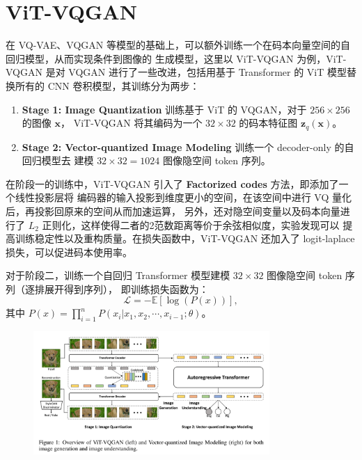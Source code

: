 \section{ViT-VQGAN}

在 VQ-VAE、VQGAN 等模型的基础上，可以额外训练一个在码本向量空间的自回归模型，从而实现条件到图像的
生成模型，这里以 ViT-VQGAN 为例，ViT-VQGAN 是对 VQGAN 进行了一些改进，包括用基于 Transformer 的
ViT 模型替换所有的 CNN 卷积模型，其训练分为两步：
\begin{enumerate}
    \item \textbf{Stage 1: Image Quantization} 训练基于 ViT 的 VQGAN，对于 $256\times256$ 的图像 $\bm{x}$，
    ViT-VQGAN 将其编码为一个 $32\times32$ 的码本特征图 $\bm{z}_q(\bm{x})$。
    \item \textbf{Stage 2: Vector-quantized Image Modeling} 训练一个 decoder-only 的自回归模型去
    建模 $32\times32=1024$ 图像隐空间 token 序列。
\end{enumerate}

在阶段一的训练中，ViT-VQGAN 引入了 \textbf{Factorized codes} 方法，即添加了一个线性投影层将
编码器的输入投影到维度更小的空间，在该空间中进行 VQ 量化后，再投影回原来的空间从而加速运算，
另外，还对隐空间变量以及码本向量进行了 $L_2$ 正则化，这样使得二者的2范数距离等价于余弦相似度，实验发现可以
提高训练稳定性以及重构质量。在损失函数中，ViT-VQGAN 还加入了 logit-laplace 损失，可以促进码本使用率。

对于阶段二，训练一个自回归 Transformer 模型建模 $32\times32$ 图像隐空间 token 序列（逐排展开得到序列），
即训练损失函数为：
\begin{equation}
    \mathcal{L} = -\mathbb{E}[\log(P(x))],
\end{equation}
其中 $P(x)=\prod_{i=1}^{n}P(x_i|x_1,x_2,\cdots,x_{i-1};\theta)$。

\begin{figure}[htbp]
    \centering 
    \includegraphics[width=0.8\textwidth]{./fig/ViT-VQGAN.png} 
\end{figure}
